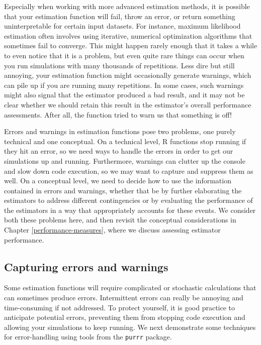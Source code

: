 \documentclass[
]{book}
\begin{document}
Especially when working with more advanced estimation methods, it is possible that your estimation function will fail, throw an error, or return something uninterpretable for certain input datasets.
For instance, maximum likelihood estimation often involves using iterative, numerical optimization algorithms that sometimes fail to converge.
This might happen rarely enough that it takes a while to even notice that it is a problem, but even quite rare things can occur when you run simulations with many thousands of repetitions.
Less dire but still annoying, your estimation function might occasionally generate warnings, which can pile up if you are running many repetitions.
In some cases, such warnings might also signal that the estimator produced a bad result, and
it may not be clear whether we should retain this result in the estimator's overall performance assessments.
After all, the function tried to warn us that something is off!

Errors and warnings in estimation functions pose two problems, one purely technical and one conceptual.
On a technical level, R functions stop running if they hit an error, so we need ways to handle the errors in order to get our simulations up and running.
Furthermore, warnings can clutter up the console and slow down code execution, so we may want to capture and suppress them as well.
On a conceptual level, we need to decide how to use the information contained in errors and warnings, whether that be by further elaborating the estimators to address different contingencies or by evaluating the performance of the estimators in a way that appropriately accounts for these events.
We consider both these problems here, and then revisit the conceptual considerations in Chapter \ref{performance-measures}, where we discuss assessing estimator performance.

\subsection{Capturing errors and warnings}\label{capturing-errors-and-warnings}

Some estimation functions will require complicated or stochastic calculations that can sometimes produce errors.
Intermittent errors can really be annoying and time-consuming if not addressed.
To protect yourself, it is good practice to anticipate potential errors, preventing them from stopping code execution and allowing your simulations to keep running.
We next demonstrate some techniques for error-handling using tools from the \texttt{purrr} package.
\end{document}
